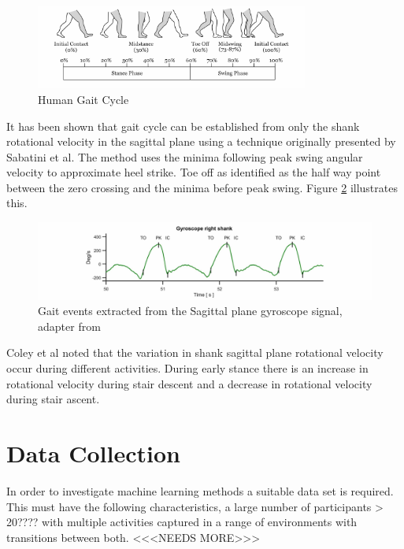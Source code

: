 \documentclass[sensors,article,submit,moreauthors,pdftex]{Definitions/mdpi}
\begin{document}
\begin{figure}[!htb]
    \centering
    \includegraphics[width=0.8\textwidth]{Figures/Gait_Cycle.jpg}
    \caption{Human Gait Cycle}
    \label{fig:gait_cycle}
\end{figure}

It has been shown that gait cycle can be established from only the shank rotational velocity in the sagittal plane using a technique originally presented by Sabatini et al\cite{Sabatini2005}. The method uses the minima following peak swing angular velocity to approximate heel strike. Toe off as identified as the half way point between the zero crossing and the minima before peak swing. Figure \ref{fig:y-gyro-hs-to} illustrates this.

\begin{figure}[!htb]
    \centering
    \includegraphics[width=\textwidth]{Figures/gyro_trace_hs.jpg}
    \caption{Gait events extracted from the Sagittal plane gyroscope signal, adapter from \cite{Sabatini2005}}
    \label{fig:y-gyro-hs-to}
\end{figure}

Coley et al noted that the variation in shank sagittal plane rotational velocity occur during different activities. During early stance there is an increase in rotational velocity during stair descent and a decrease in rotational velocity during stair ascent.\cite{Coley2005}



\section{Data Collection}
In order to investigate machine learning methods a suitable data set is required. This must have the following characteristics, a large number of participants > 20???? with multiple activities captured in a range of environments with transitions between both. <<<NEEDS MORE>>>
\end{document}
